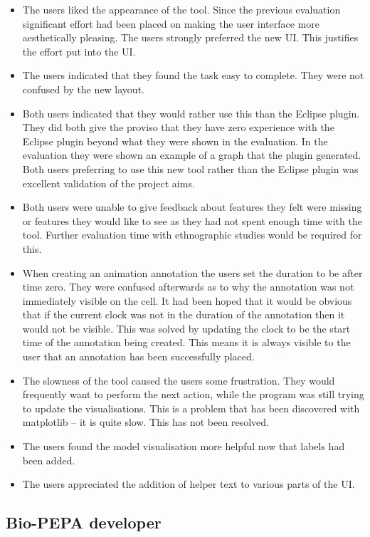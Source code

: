 \begin{itemize}
\item The users liked the appearance of the tool.  Since the previous evaluation significant effort had been placed on making the user interface more aesthetically pleasing.  The users strongly preferred the new \ac{UI}.  This justifies the effort put into the \ac{UI}.
\item The users indicated that they found the task easy to complete.  They were not confused by the new layout.
\item Both users indicated that they would rather use this than the Eclipse plugin.  They did both give the proviso that they have zero experience with the Eclipse plugin beyond what they were shown in the evaluation.  In the evaluation they were shown an example of a graph that the plugin generated.  Both users preferring to use this new tool rather than the Eclipse plugin was excellent validation of the project aims.
\item Both users were unable to give feedback about features they felt were missing or features they would like to see as they had not spent enough time with the tool.  Further evaluation time with ethnographic studies would be required for this.
\item When creating an animation annotation the users set the duration to be after time zero.  They were confused afterwards as to why the annotation was not immediately visible on the cell.  It had been hoped that it would be obvious that if the current clock was not in the duration of the annotation then it would not be visible.  This was solved by updating the clock to be the start time of the annotation being created. This means it is always visible to the user that an annotation has been successfully placed.
\item The slowness of the tool caused the users some frustration.  They would frequently want to perform the next action, while the program was still trying to update the visualisations.  This is a problem that has been discovered with matplotlib -- it is quite slow.  This has not been resolved.
\item The users found the model visualisation more helpful now that labels had been added.
\item The users appreciated the addition of helper text to various parts of the \ac{UI}.
\end{itemize}

\subsection{Bio-PEPA developer}

